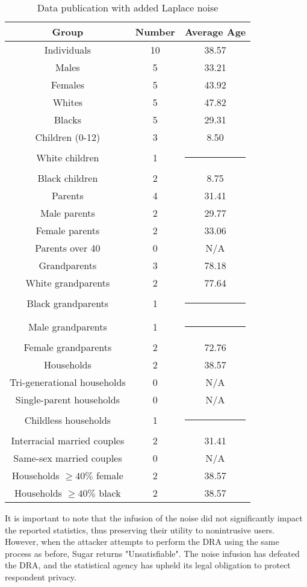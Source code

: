 \documentclass[5p,times,11pt]{elsarticle}
\begin{document}
\begin{table}[t]
\begin{tabular}{c|c|c}
Group & Number & Average Age \\
\hline
Individuals & 10 & 38.57 \\
Males & 5 & 33.21 \\
Females & 5 & 43.92 \\
Whites & 5 & 47.82 \\
Blacks & 5 & 29.31 \\
\hline
Children (0-12) & 3 & 8.50 \\
White children & 1 & \multicolumn{1}{c}{\rule{6mm}{3mm}} \\
Black children & 2 & 8.75 \\
\hline
Parents & 4 & 31.41 \\
Male parents & 2 & 29.77 \\
Female parents & 2 & 33.06 \\
Parents over 40 & 0 & N/A \\
\hline
Grandparents & 3 & 78.18 \\
White grandparents & 2 & 77.64 \\
Black grandparents & 1 & \multicolumn{1}{c}{\rule{6mm}{3mm}} \\
Male grandparents & 1 & \multicolumn{1}{c}{\rule{6mm}{3mm}} \\
Female grandparents & 2 & 72.76 \\
\hline
Households & 2 & 38.57 \\
Tri-generational households & 0 & N/A \\
Single-parent households & 0 & N/A \\
Childless households & 1 & \multicolumn{1}{c}{\rule{6mm}{3mm}} \\
Interracial married couples & 2 & 31.41 \\
Same-sex married couples & 0 & N/A \\
Households $\geq 40\% $ female & 2 & 38.57 \\
Households $\geq 40\% $ black & 2 & 38.57 \\

\hline
\end{tabular}
\caption{Data publication with added Laplace noise}\label{publishedstatsnoise}
\end{table}
It is important to note that the infusion of the noise did not significantly impact the reported statistics, thus preserving their utility to nonintrusive users. However, when the attacker attempts to perform the DRA using the same process as before, Sugar returns "Unsatisfiable". The noise infusion has defeated the DRA, and the statistical agency has upheld its legal obligation to protect respondent privacy.
\end{document}
